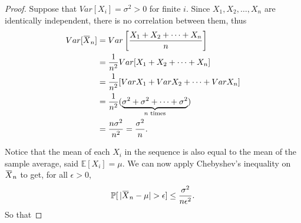 \begin{proof}
    Suppose that $Var[X_i] = \sigma^2 > 0$ for finite $i$. Since 
    $X_1, X_2, \ldots, X_n$ are identically independent, there is no 
    correlation between them, thus
    \begin{align*}
        Var[\ols{X}_n] &= Var \left[ \frac{X_1 + X_2 + \cdots + X_n}{n} \right]\\
        &= \frac{1}{n^2} Var[X_1 + X_2 + \cdots + X_n]\\
        &= \frac{1}{n^2} [Var X_1 + Var X_2 + \cdots + Var X_n]\\
        &= \frac{1}{n^2} (\underbrace{\sigma^2 + \sigma^2 + \cdots + \sigma^2}_{n \text{ times}})\\
        &= \frac{n\sigma^2}{n^2}
        = \frac{\sigma^2}{n}.
    \end{align*}

    Notice that the mean of each $X_i$ in the sequence is also equal to the mean of the sample average, 
    said $\mathbb{E}[X_i] = \mu$. We can now apply Chebyshev's inequality on $\ols{X}_n$ to get, for all 
    $\epsilon > 0$, 
    \[
        \mathbb{P}[\, |\ols{X}_n - \mu| > \epsilon] \leq \frac{\sigma^2}{n\epsilon^2}.
    \]
    So that 
\end{proof}

